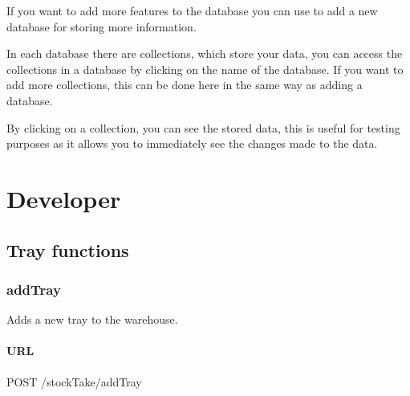 \documentclass[letterpaper,10pt,english]{sphinxmanual}
\let\sphinxpxdimen\pdfpxdimen\else\newdimen\sphinxpxdimen
\let\oldsubsection\subsection
\renewcommand{\subsection}{\needspace{6\baselineskip}\oldsubsection}
\begin{document}
\noindent{\hspace*{\fill}\sphinxincludegraphics[width=500\sphinxpxdimen]{{databases}.png}\hspace*{\fill}}

If you want to add more features to the database you can use
 to add a new database for storing more information.

In each database there are collections, which store your data, you can
access the collections in a database by clicking on the name of the
database. If you want to add more collections, this can be done here in
the same way as adding a database.

By clicking on a collection, you can see the stored data, this is useful
for testing purposes as it allows you to immediately see the changes
made to the data.


\chapter{Developer}
\label{\detokenize{index:developer}}

\section{Tray functions}
\label{\detokenize{docs/Developer/index:tray-functions}}\label{\detokenize{docs/Developer/index::doc}}

\subsection{addTray}
\label{\detokenize{docs/Developer/addTray:addtray}}\label{\detokenize{docs/Developer/addTray::doc}}
Adds a new tray to the warehouse.


\subsubsection{URL}
\label{\detokenize{docs/Developer/addTray:url}}
\begin{sphinxVerbatim}[commandchars=\\\{\}]
POST /stockTake/addTray
\end{sphinxVerbatim}
\end{document}
